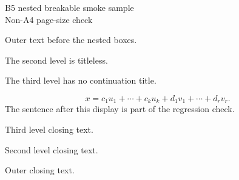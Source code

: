 \documentclass[b5paper,10pt]{article}
\newcommand{\BfiveMathBlock}{%
\lipsum[1]
\[
  x=c_1u_1+\cdots+c_ku_k+d_1v_1+\cdots+d_rv_r.
\]
The sentence after this display is part of the regression check.
\lipsum[2-4]
}
\begin{document}
\begin{center}
{\Large B5 nested breakable smoke sample}\\[2mm]
{\small Non-A4 page-size check}
\end{center}

\lipsum[1-3]

\begin{b5onebox}[title={B5 outer},title after break={B5 outer continued}]
Outer text before the nested boxes.

\begin{b5twobox}
The second level is titleless.

\begin{b5threebox}[title={B5 third level},notitle after break]
The third level has no continuation title.

\begin{b5fourbox}
\BfiveMathBlock
\end{b5fourbox}

Third level closing text.
\end{b5threebox}

Second level closing text.
\end{b5twobox}

Outer closing text.
\end{b5onebox}
\end{document}
